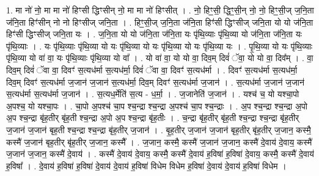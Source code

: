 \documentclass[17pt]{extarticle}
\begin{document}
1. मा नो॑ नो॒ मा मा नो॑ हिꣳसी द्धिꣳसीन् नो॒ मा मा नो॑ हिꣳसीत् । . नो॒ हिꣳ॒॒सी॒ द्धिꣳ॒॒सी॒न् नो॒ नो॒ हिꣳ॒॒सी॒ज् ज॒नि॒ता ज॑नि॒ता हिꣳ॑सीन् नो नो हिꣳसीज् जनि॒ता । . हिꣳ॒॒सी॒ज् ज॒नि॒ता ज॑नि॒ता हिꣳ॑सी द्धिꣳसीज् जनि॒ता यो यो ज॑नि॒ता हिꣳ॑सी द्धिꣳसीज् जनि॒ता यः । . ज॒नि॒ता यो यो ज॑नि॒ता ज॑नि॒ता यः पृ॑थि॒व्याः पृ॑थि॒व्या यो ज॑नि॒ता ज॑नि॒ता यः पृ॑थि॒व्याः । . यः पृ॑थि॒व्याः पृ॑थि॒व्या यो यः पृ॑थि॒व्या यो यः पृ॑थि॒व्या यो यः पृ॑थि॒व्या यः । . पृ॒थि॒व्या यो यः पृ॑थि॒व्याः पृ॑थि॒व्या यो वा॑ वा॒ यः पृ॑थि॒व्याः पृ॑थि॒व्या यो वा᳚ । . यो वा॑ वा॒ यो यो वा॒ दिव॒म् दिवं॑ ॅवा॒ यो यो वा॒ दिव᳚म् । . वा॒ दिव॒म् दिवं॑ ॅवा वा॒ दिवꣳ॑ स॒त्यध॑र्मा स॒त्यध॑र्मा॒ दिवं॑ ॅवा वा॒ दिवꣳ॑ स॒त्यध॑र्मा । . दिवꣳ॑ स॒त्यध॑र्मा स॒त्यध॑र्मा॒ दिव॒म् दिवꣳ॑ स॒त्यध॑र्मा ज॒जान॑ ज॒जान॑ स॒त्यध॑र्मा॒ दिव॒म् दिवꣳ॑ स॒त्यध॑र्मा ज॒जान॑ । . स॒त्यध॑र्मा ज॒जान॑ ज॒जान॑ स॒त्यध॑र्मा स॒त्यध॑र्मा ज॒जान॑ । . स॒त्यध॒र्मेति॑ स॒त्य - ध॒र्मा॒ । . ज॒जानेति॑ ज॒जान॑ । . यश्च॑ च॒ यो यश्चा॒पो अ॒पश्च॒ यो यश्चा॒पः । . चा॒पो अ॒पश्च॑ चा॒प श्च॒न्द्रा श्च॒न्द्रा अ॒पश्च॑ चा॒प श्च॒न्द्राः । . अ॒प श्च॒न्द्रा श्च॒न्द्रा अ॒पो अ॒प श्च॒न्द्रा बृ॑ह॒तीर् बृ॑ह॒ती श्च॒न्द्रा अ॒पो अ॒प श्च॒न्द्रा बृ॑ह॒तीः । . च॒न्द्रा बृ॑ह॒तीर् बृ॑ह॒ती श्च॒न्द्रा श्च॒न्द्रा बृ॑ह॒तीर् ज॒जान॑ ज॒जान॑ बृह॒ती श्च॒न्द्रा श्च॒न्द्रा बृ॑ह॒तीर् ज॒जान॑ । . बृ॒ह॒तीर् ज॒जान॑ ज॒जान॑ बृह॒तीर् बृ॑ह॒तीर् ज॒जान॒ कस्मै॒ कस्मै॑ ज॒जान॑ बृह॒तीर् बृ॑ह॒तीर् ज॒जान॒ कस्मै᳚ । . ज॒जान॒ कस्मै॒ कस्मै॑ ज॒जान॑ ज॒जान॒ कस्मै॑ दे॒वाय॑ दे॒वाय॒ कस्मै॑ ज॒जान॑ ज॒जान॒ कस्मै॑ दे॒वाय॑ । . कस्मै॑ दे॒वाय॑ दे॒वाय॒ कस्मै॒ कस्मै॑ दे॒वाय॑ ह॒विषा॑ ह॒विषा॑ दे॒वाय॒ कस्मै॒ कस्मै॑ दे॒वाय॑ ह॒विषा᳚ । . दे॒वाय॑ ह॒विषा॑ ह॒विषा॑ दे॒वाय॑ दे॒वाय॑ ह॒विषा॑ विधेम विधेम ह॒विषा॑ दे॒वाय॑ दे॒वाय॑ ह॒विषा॑ विधेम । \newline
\end{document}
